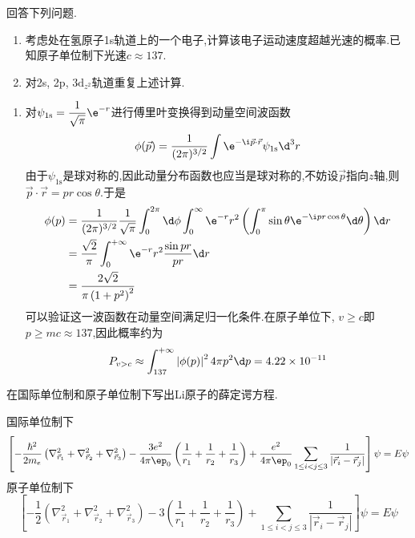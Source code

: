 \documentclass{ctexart}
\begin{document}
\begin{homework}[7.]
    回答下列问题.
    \begin{enumerate}[label=\tbf{(\alph*)}]
        \item 考虑处在氢原子1s轨道上的一个电子,计算该电子运动速度超越光速的概率.已知原子单位制下光速$c\approx137$.
        \item 对2s, 2p, $3\text{d}_{z^2}$轨道重复上述计算.
    \end{enumerate}
\end{homework}
\begin{solution}
\begin{enumerate}[label=\tbf{(\alph*)}]
    \item 对$\psi_{1\text{s}}=\dfrac{1}{\sqrt{\pi}}\e^{-r}$进行傅里叶变换得到动量空间波函数
    \[\phi(\vec{p})=\dfrac{1}{(2\pi)^{3/2}}\int\e^{-\i\vec{p}\cdot\vec{r}}\psi_{1\text{s}}\d^3r\]
    由于$\psi_{1\text{s}}$是球对称的,因此动量分布函数也应当是球对称的,不妨设$\vec{p}$指向$z$轴,则$\vec{p}\cdot\vec{r}=pr\cos\theta$.于是
    \[\begin{aligned}
        \phi(p)
        &=\dfrac{1}{(2\pi)^{3/2}}\dfrac{1}{\sqrt{\pi}}\int_0^{2\pi}\d\phi\int_0^{\infty}\e^{-r}r^2\left(\int_0^{\pi}\sin\theta\e^{-\i pr\cos\theta}\d\theta\right)\d r\\
        &=\dfrac{\sqrt2}{\pi}\int_0^{+\infty}\e^{-r}r^2\dfrac{\sin pr}{pr}\d r\\
        &=\dfrac{2\sqrt{2}}{\pi\left(1+p^2\right)^2}
    \end{aligned}\]
    可以验证这一波函数在动量空间满足归一化条件.在原子单位下, $v\geq c$即$p\geq mc\approx137$,因此概率约为
    \[P_{v>c}\approx\int_{137}^{+\infty}\left|\phi(p)\right|^24\pi p^2\d p=4.22\times10^{-11}\]
\end{enumerate} 
\end{solution}
\begin{homework}[8.]
    在国际单位制和原子单位制下写出Li原子的薛定谔方程.
\end{homework}
\begin{solution}
    国际单位制下
    \[\left[-\dfrac{\hbar^2}{2m_e}\left(\nabla_{\vec{r}_1}^2+\nabla_{\vec{r}_2}^2+\nabla_{\vec{r}_3}^2\right)-\dfrac{3e^2}{4\pi\ep_0}\left(\dfrac{1}{r_1}+\dfrac{1}{r_2}+\dfrac{1}{r_3}\right)+\dfrac{e^2}{4\pi\ep_0}\sum_{1\leq i<j\leq3}\dfrac{1}{\left|\vec{r}_i-\vec{r}_j\right|}\right]\psi=E\psi\]
    原子单位制下
    \[\left[-\dfrac12\left(\nabla_{\vec{r}_1}^2+\nabla_{\vec{r}_2}^2+\nabla_{\vec{r}_3}^2\right)-3\left(\dfrac{1}{r_1}+\dfrac{1}{r_2}+\dfrac{1}{r_3}\right)+\sum_{1\leq i<j\leq3}\dfrac{1}{\left|\vec{r}_i-\vec{r}_j\right|}\right]\psi=E\psi\]
\end{solution}
\end{document}
